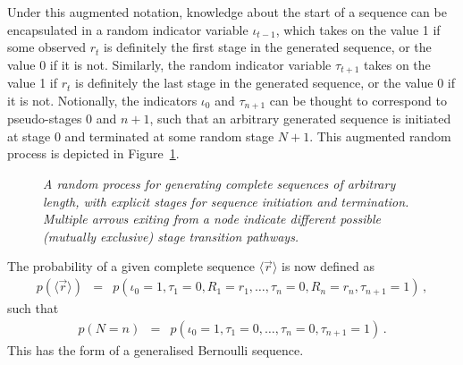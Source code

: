 \documentclass[a4paper]{article}
\begin{document}
Under this augmented notation, knowledge about the start of a sequence can be encapsulated in 
a random indicator variable $\iota_{t-1}$, which takes on the value 1 if some observed $r_{t}$ is definitely the first stage in the
generated sequence, or the value 0 if it is not. Similarly, the random indicator variable $\tau_{t+1}$
takes on the value 1 if $r_{t}$ is definitely the last stage in the generated sequence, or the value 0 if it is not.
Notionally, the indicators $\iota_0$ and $\tau_{n+1}$ can be thought to correspond to pseudo-stages 0 and $n+1$, such that
an arbitrary generated sequence is initiated at stage 0 and terminated at some random stage $N+1$.
This augmented random process is depicted in Figure~\ref{fig:random-process}. 
\begin{figure}[hbt]
\centering
{}
\caption{\em A random process for generating complete sequences of arbitrary length,
with explicit stages for sequence initiation and termination. Multiple arrows exiting from a node indicate
different possible (mutually exclusive) stage transition pathways.}
\label{fig:random-process}
\end{figure}

The probability of a given complete sequence $\langle\vec{r}\rangle$ is now defined as
\begin{eqnarray}
   p(\langle\vec{r}\rangle)
& = & p(\iota_0\!=\!1,\tau_1\!=\!0,R_1=r_1,\ldots,\tau_n\!=\!0,R_n=r_n,\tau_{n+1}\!=\!1)
\label{eq:p_r_complete}
\,,
\end{eqnarray}
such that 
\begin{eqnarray}
   p(N\!=\!n) & = &  p(\iota_0\!=\!1,\tau_1\!=\!0,\ldots,\tau_n\!=\!0,\tau_{n+1}\!=\!1)\,.
\end{eqnarray}
This has the form of a generalised Bernoulli sequence.
\end{document}
